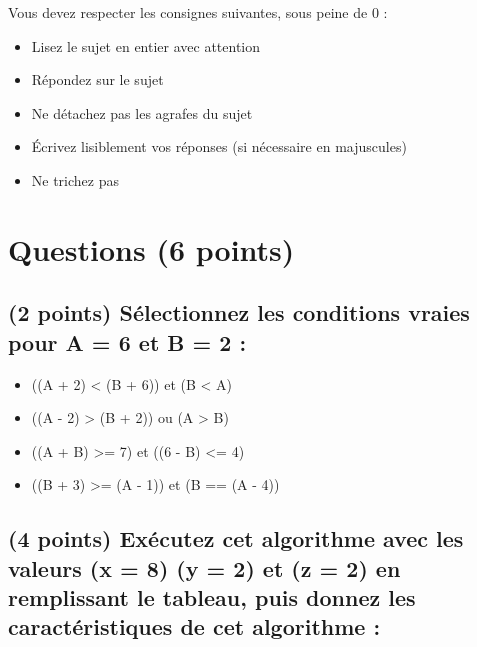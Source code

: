 \documentclass[11pt,a4paper]{article}
\begin{document}
\MakeExamTitle                   %


\bigskip

Vous devez respecter les consignes suivantes, sous peine de 0 :

\begin{itemize}
\item Lisez le sujet en entier avec attention
\item Répondez sur le sujet
\item Ne détachez pas les agrafes du sujet
\item \'Ecrivez lisiblement vos réponses (si nécessaire en majuscules)
\item Ne trichez pas
\end{itemize}



\section{Questions (6 points)}

\subsection{(2 points) Sélectionnez les conditions vraies pour A = 6 et B = 2 : }

\bigskip

\begin{itemize}
  \item[\CaseCoche] ((A + 2) < (B + 6)) et (B < A)   %
  \item[\CaseCoche] ((A - 2) > (B + 2)) ou (A > B)   %
  \item[\CaseCoche] ((A + B) >= 7) et ((6 - B) <= 4) %
  \item[\CaseCoche] ((B + 3) >= (A - 1)) et (B == (A - 4)) %
\end{itemize}


\medskip


\subsection{(4 points) Exécutez cet algorithme avec les valeurs (x = 8) (y = 2) et (z = 2) en remplissant le tableau, puis donnez les caractéristiques de cet algorithme : }
\end{document}
